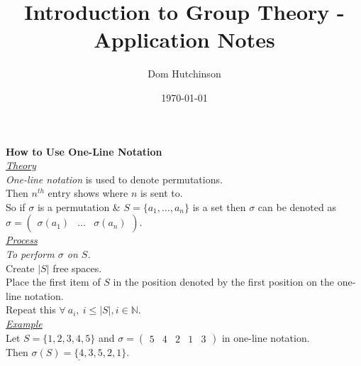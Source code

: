 \documentclass[11pt,a4paper]{article}
\begin{document}
\pagestyle{fancy}
\setlength\parindent{0pt}
\allowdisplaybreaks

\renewcommand{\headrulewidth}{0pt}
\newcommand{\vect}[1]{\boldsymbol{#1}}
\newcommand{\dotprod}[0]{\boldsymbol{\cdot}}
\newcommand{\real}[0]{\mathbb{R}}
\newcommand{\field}[0]{\mathbb{F}}
\newcommand{\naturals}[0]{\mathbb{N}}
\newcommand{\complex}[0]{\mathbb{C}}
\newcommand{\integers}[0]{\mathbb{Z}}
\newcommand{\innerproduct}[2]{\langle #1, #2 \rangle}
\newcommand{\tit}[1]{\textbf{#1}\\}
\newcommand{\subtit}[1]{\underline{\textit{#1}}\\}
\newcommand{\cosec}[0]{\mathrm{cosec}}

\title{Introduction to Group Theory - Application Notes}
\author{Dom Hutchinson}
\date{\today}
\maketitle

\fancyhead[R]{\today}

\tit{How to Use One-Line Notation}

\subtit{Theory}
\textit{One-line notation} is used to denote permutations.\\
Then $n^{th}$ entry shows where $n$ is sent to.\\
So if $\sigma$ is a permutation \& $S = \{ a_1, \dots, a_n\}$ is a set then $\sigma$ can be denoted as $\sigma = \begin{pmatrix} \sigma(a_1) & \dots & \sigma(a_n) \end{pmatrix}$.\\

\subtit{Process}
\textit{To perform $\sigma$ on $S$.}\\
Create $|S|$ free spaces.\\
Place the first item of $S$ in the position denoted by the first position on the one-line notation.\\
Repeat this $\forall\ a_i,\ i \leq |S|, i \in \naturals$.\\

\subtit{Example}
Let $S = \{1,2,3,4,5 \}$ and $\sigma = \begin{pmatrix}5 & 4 & 2 & 1 & 3 \end{pmatrix}$ in one-line notation.\\
Then $\underline{\sigma(S) = \{4,3,5,2,1 \}}$.\\
\end{document}
